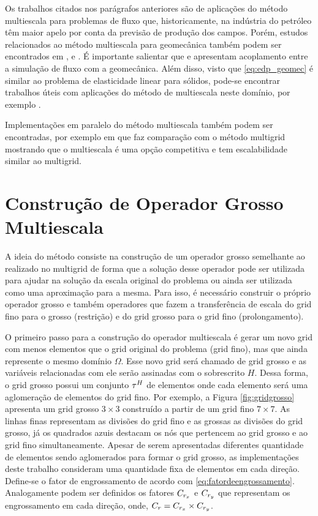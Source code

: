 Os trabalhos citados nos parágrafos anteriores são de aplicações do método multiescala para problemas de fluxo que, historicamente, na indústria do petróleo têm maior apelo por conta da previsão de produção dos campos. Porém, estudos relacionados ao método multiescala para geomecânica também podem ser encontrados em \citet{casteletto}, \citet{irina} e \citet{castelettoacoplado}. É importante salientar que \cite{casteletto} e \cite{irina} apresentam acoplamento entre a simulação de fluxo com a geomecânica. Além disso, visto que \eqref{eq:edp_geomec} é similar ao problema de elasticidade linear para sólidos, pode-se encontrar trabalhos úteis com aplicações do método de multiescala neste domínio, por exemplo \citet{mbuck}. 

Implementações em paralelo do método multiescala também podem ser encontradas, por exemplo em \citet{msparalelo} que faz comparação com o método multigrid mostrando que o multiescala é uma opção competitiva e tem escalabilidade similar ao multigrid.

\section{Construção de Operador Grosso Multiescala}

A ideia do método consiste na construção de um operador grosso semelhante ao realizado no multigrid de forma que a solução desse operador pode ser utilizada para ajudar na solução da escala original do problema ou ainda ser utilizada como uma aproximação para a mesma. Para isso, é necessário construir o próprio operador grosso e também operadores que fazem a transferência de escala do grid fino para o grosso (restrição) e do grid grosso para o grid fino (prolongamento).


O primeiro passo para a construção do operador multiescala é gerar um novo grid com menos elementos que o grid original do problema (grid fino), mas que ainda represente o mesmo domínio $\Omega$. Esse novo grid será chamado de grid grosso e as variáveis relacionadas com ele serão assinadas com o sobrescrito $H$.
Dessa forma, o grid grosso possui um conjunto $\tau^H$ de elementos onde cada elemento será uma aglomeração de elementos do grid fino. Por exemplo, a Figura \ref{fig:gridgrosso} apresenta um grid grosso $3\times 3$ construído a partir de um grid fino $7\times 7$.  As linhas finas representam as divisões do grid fino e as grossas as divisões do grid grosso, já os  quadrados azuis destacam os nós que pertencem ao grid grosso e ao grid fino simultaneamente. Apesar de serem apresentadas diferentes quantidade de elementos sendo aglomerados para formar o grid grosso, as implementações deste trabalho consideram uma quantidade fixa de elementos em cada direção. Define-se o fator de engrossamento de acordo com \eqref{eq:fatordeengrossamento}. Analogamente podem ser definidos os fatores $C_{r_x}$ e $C_{r_y}$ que representam os engrossamento em cada direção, onde, $C_r = C_{r_x} \times C_{r_y}$.

